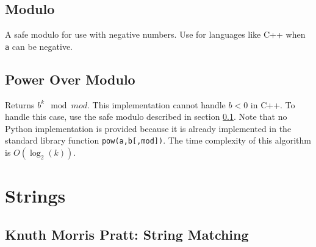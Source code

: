 \documentclass[letterpaper,11pt,twoside]{article}
\begin{document}
            \subsection{Modulo} \label{modulo}
                A safe modulo for use with negative numbers.
                Use for languages like C++ when \verb|a| can be negative.
                
            \subsection{Power Over Modulo} \label{power}
                Returns $b^{k} \mod mod$.
                This implementation cannot handle $b < 0$ in C++.
                To handle this case, use the safe modulo described in section \ref{modulo}.
                Note that no Python implementation is provided because it is already implemented in the standard library function \verb|pow(a,b[,mod])|.
                The time complexity of this algorithm is $O(\log_{2}(k))$.
                
        \section{Strings}
            \subsection{Knuth Morris Pratt: String Matching} \label{kmp}
\end{document}
